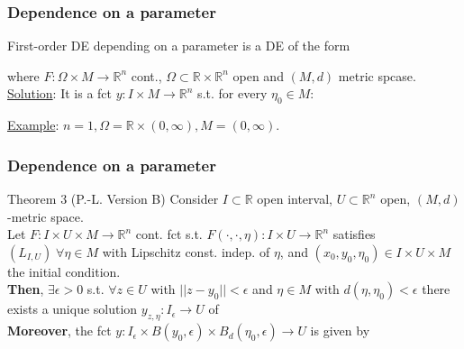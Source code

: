 \documentclass[10pt]{beamer}
\newcommand{\R}{\mathbb{R}}
\begin{document}
{\begin{frame}
\end{frame}

\begin{frame}\frametitle{Dependence on a parameter}
First-order DE depending on a parameter is a DE of the form
\begin{block}{}
\vspace{0.3cm}
\end{block}
where $F:\Omega \times M \rightarrow \R^n$ cont., $\Omega\subset \R \times \R^n$ open and $(M,d)$ metric spcase.\\
\vspace{0.2cm}
\underline{Solution}: It is a fct $y:I \times M \rightarrow \R^n$ s.t. for every $\eta_0 \in M$:
\begin{block}{}
\vspace{0.3cm}
\end{block}
\vspace{0.3cm}
\underline{Example}: $n=1, \Omega=\R \times (0, \infty), M=(0, \infty)$.\\
\vspace{2cm}

\end{frame}

\begin{frame}\frametitle{Dependence on a parameter}
\begin{block}{Theorem 3 (P.-L.  Version B)}
Consider $I \subset \R$ open interval, $U \subset \R^n$ open, $(M,d)$-metric space.\\
Let $F:I \times U \times M \rightarrow \R^n$ cont. fct s.t. $F(\cdot, \cdot, \eta): I \times U \rightarrow \R^n$ satisfies $(L_{I,U})\; \forall \eta \in M$ with Lipschitz const. indep. of $\eta$,  and $(x_0,y_0,\eta_0) \in I \times U \times M$ the initial condition.\\
\textbf{Then}, $\exists \epsilon >0$ s.t. $\forall z \in U$ with $||z-y_0|| < \epsilon$ and $\eta \in M$ with $d(\eta, \eta_0) < \epsilon$ there exists a unique solution $y_{z,\eta}:I_\epsilon \rightarrow U$ of\\
$$\;$$
\textbf{Moreover}, the fct $y:I_\epsilon \times B(y_0,\epsilon) \times B_d(\eta_0,\epsilon) \rightarrow U$ is given by
$$\;$$%
\end{block}
\end{frame}


}
\end{document}
